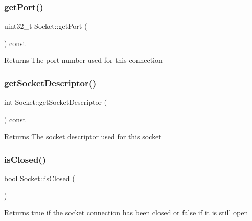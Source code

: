 \subsubsection{\texorpdfstring{get\+Port()}{getPort()}}
{\footnotesize\ttfamily uint32\+\_\+t Socket\+::get\+Port (\begin{DoxyParamCaption}{ }\end{DoxyParamCaption}) const}

\begin{DoxyReturn}{Returns}
The port number used for this connection 
\end{DoxyReturn}
\mbox{\label{classSocket_afd21401fa7f8ff6ad4e3083142bb9ade}} 
\subsubsection{\texorpdfstring{get\+Socket\+Descriptor()}{getSocketDescriptor()}}
{\footnotesize\ttfamily int Socket\+::get\+Socket\+Descriptor (\begin{DoxyParamCaption}{ }\end{DoxyParamCaption}) const}

\begin{DoxyReturn}{Returns}
The socket descriptor used for this socket 
\end{DoxyReturn}
\mbox{\label{classSocket_a7e54aa5a8807a44096258b41fd27ecf3}} 
\subsubsection{\texorpdfstring{is\+Closed()}{isClosed()}}
{\footnotesize\ttfamily bool Socket\+::is\+Closed (\begin{DoxyParamCaption}{ }\end{DoxyParamCaption})}

\begin{DoxyReturn}{Returns}
true if the socket connection has been closed or false if it is still open 
\end{DoxyReturn}
\mbox{\label{classSocket_a14aeb614f43be5dccd69c7bec6a0e1e8}} 
